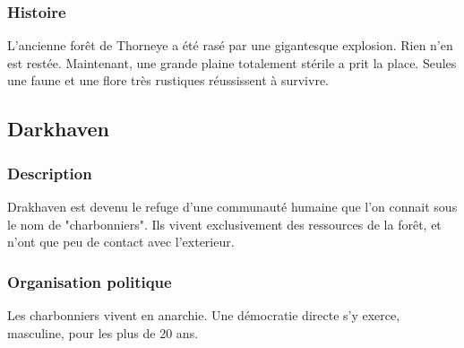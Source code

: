 \subsubsection{Histoire}
\hypertarget{natskhaz}{}L'ancienne forêt de Thorneye a été rasé par une gigantesque explosion.
Rien n'en est restée.
Maintenant, une grande plaine totalement stérile a prit la place.
Seules une faune et une flore très rustiques réussissent à survivre.

\subsection{Darkhaven}
\subsubsection{Description}
Drakhaven est devenu le refuge d'une communauté humaine que l'on connait sous le nom de "charbonniers". Ils vivent exclusivement des ressources de la forêt, et n'ont que peu de contact avec l'exterieur.
\subsubsection{Organisation politique}
Les charbonniers vivent en anarchie. Une démocratie directe s'y exerce, masculine, pour les plus de 20 ans.
